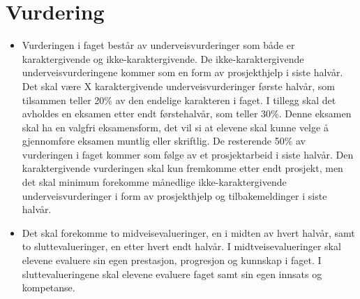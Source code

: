 \section*{Vurdering} \label{Sec: Vurdering}

    \begin{itemize}

        \item Vurderingen i faget består av underveisvurderinger som både er karaktergivende og ikke-karaktergivende. De ikke-karaktergivende underveisvurderingene kommer som en form av prosjekthjelp i siste halvår. Det skal være X karaktergivende underveisvurderinger første halvår, som tilsammen teller 20\% av den endelige karakteren i faget. I tillegg skal det avholdes en eksamen etter endt førstehalvår, som teller 30\%. Denne eksamen skal ha en valgfri eksamensform, det vil si at elevene skal kunne velge å gjennomføre eksamen muntlig eller skriftlig. De resterende 50\% av vurderingen i faget kommer som følge av et prosjektarbeid i siste halvår. Den karaktergivende vurderingen skal kun fremkomme etter endt prosjekt, men det skal minimum forekomme månedlige ikke-karaktergivende underveisvurderinger i form av prosjekthjelp og tilbakemeldinger i siste halvår.

        \item Det skal forekomme to midveisevalueringer, en i midten av hvert halvår, samt to sluttevalueringer, en etter hvert endt halvår. I midtveisevalueringer skal elevene evaluere sin egen prestasjon, progresjon og kunnskap i faget. I sluttevalueringene skal elevene evaluere faget samt sin egen innsats og kompetanse.

    \end{itemize}
